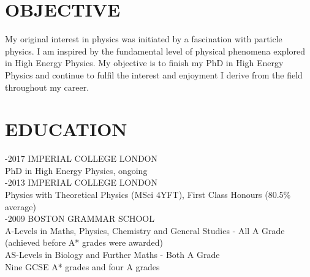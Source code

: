 \documentclass[9pt]{res} %
\begin{document}
 
 
\vspace{0.2cm}
\address{ \\44 Rue de la Combette, St Genis-Pouilly, Ain, France. 01630\\  +447815 520631	adam.elwood09@imperial.ac.uk}
 
                                             
\begin{resume}
                                               
 
\section{OBJECTIVE}
\vspace{0.2cm}
   My original interest in physics was initiated by a fascination with particle physics. I am inspired by the fundamental level of physical phenomena explored in High Energy Physics. My objective is to finish my PhD in High Energy Physics and continue to fulfil the interest and enjoyment I derive from the field throughout my career.
   
\section{EDUCATION} 

\vspace{0.2cm}

-2017 IMPERIAL COLLEGE LONDON \\
PhD in High Energy Physics, ongoing \\

 -2013 IMPERIAL COLLEGE LONDON \\
Physics with Theoretical Physics (MSci 4YFT), First Class Honours (80.5\% average) \\

-2009 BOSTON GRAMMAR SCHOOL \\
A-Levels in Maths, Physics, Chemistry and General Studies - All A Grade (achieved before A* grades were awarded)\\
AS-Levels in Biology and Further Maths - Both A Grade\\
Nine GCSE A* grades and four A grades\\
 

\end{resume}
\end{document}
